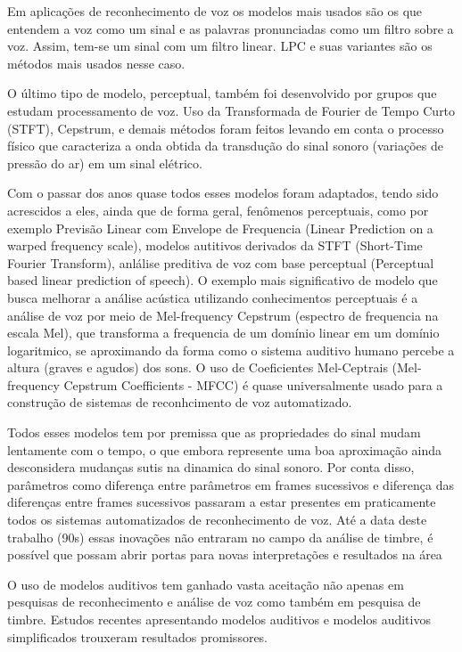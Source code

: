 Em aplicações de reconhecimento de voz os modelos mais usados são os que
entendem a voz como um sinal e as palavras pronunciadas como um filtro sobre a
voz. Assim, tem-se um sinal com um filtro linear. LPC e suas variantes são os
métodos mais usados nesse caso.

O último tipo de modelo, perceptual, também foi desenvolvido por grupos que
estudam processamento de voz. Uso da Transformada de Fourier de Tempo Curto
(STFT), Cepstrum, e demais métodos foram feitos levando em conta o processo
físico que caracteriza a onda obtida da transdução do sinal sonoro (variações
de pressão do ar) em um sinal elétrico.

Com o passar dos anos quase todos esses modelos foram adaptados, tendo sido
acrescidos a eles, ainda que de forma geral, fenômenos perceptuais, como por
exemplo Previsão Linear com Envelope de Frequencia (Linear Prediction on a
warped frequency scale), modelos autitivos derivados da STFT (Short-Time
Fourier Transform), anlálise preditiva de voz com base perceptual (Perceptual
based linear prediction of speech). O exemplo mais significativo de modelo que
busca melhorar a análise acústica utilizando conhecimentos perceptuais é a
análise de voz por meio de Mel-frequency Cepstrum (espectro de frequencia na
escala Mel), que transforma a frequencia de um domínio linear em um domínio
logaritmico, se aproximando da forma como o sistema auditivo humano percebe a
altura (graves e agudos) dos sons. O uso de Coeficientes Mel-Ceptrais
(Mel-frequency Cepstrum Coefficients - MFCC) é quase universalmente usado para
a construção de sistemas de reconhcimento de voz automatizado. 

Todos esses modelos tem por premissa que as propriedades do sinal mudam
lentamente com o tempo, o que embora represente uma boa aproximação ainda
desconsidera mudanças sutis na dinamica do sinal sonoro. Por conta disso,
parâmetros como diferença entre parâmetros em frames sucessivos e diferença
das diferenças entre frames sucessivos passaram a estar presentes em
praticamente todos os sistemas automatizados de reconhecimento de voz.
Até a data deste trabalho (90s) essas inovações não entraram no campo da
análise de timbre, é possível que possam abrir portas para novas
interpretações e resultados na área

O uso de modelos auditivos tem ganhado vasta aceitação não apenas em pesquisas
de reconhecimento e análise de voz como também em pesquisa de timbre. Estudos
recentes apresentando modelos auditivos e modelos auditivos simplificados
trouxeram resultados promissores.

